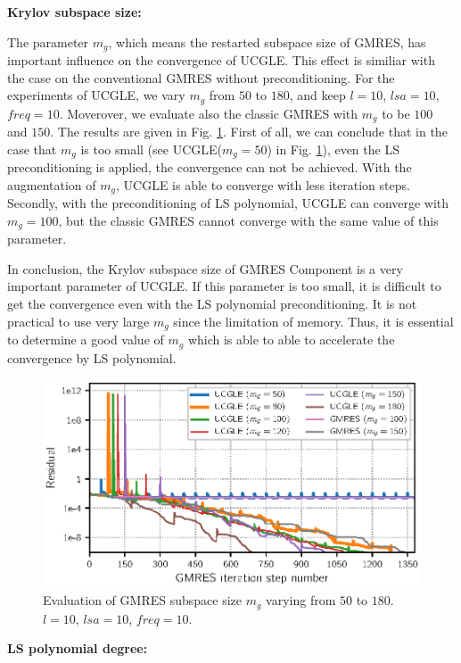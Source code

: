\textbf{Krylov subspace size: }

The parameter $m_g$, which means the restarted subspace size of GMRES, has important influence on the convergence of UCGLE.  This effect is similiar with the case on the conventional GMRES without preconditioning. For the experiments of UCGLE, we vary $m_g$ from $50$ to $180$, and keep $l=10$, $lsa=10$, $freq=10$. Moverover, we evaluate also the classic GMRES with $m_g$ to be $100$ and $150$. The results are given in Fig. \ref{fig:krylovsubspace}. First of all, we can conclude that in the case that $m_g$ is too small (see UCGLE($m_g=50$) in  Fig. \ref{fig:krylovsubspace}), even the LS preconditioning is applied, the convergence can not be achieved. With the augmentation of $m_g$, UCGLE is able to converge with less iteration steps. Secondly, with the preconditioning of LS polynomial, UCGLE can converge with $m_g=100$, but the classic GMRES cannot converge with the same value of this parameter.

In conclusion, the Krylov subspace size of GMRES Component is a very important parameter of UCGLE. If this parameter is too small, it is difficult to get the convergence even with the LS polynomial preconditioning. It is not practical to use very large $m_g$ since the limitation of memory. Thus, it is essential to determine a good value of $m_g$ which is able to able to accelerate the convergence by LS polynomial.

\begin{figure}[htbp]
	\centering
	\includegraphics[width=6.2in]{fig/conv_ksp_gmres.eps}
	\caption{Evaluation of GMRES subspace size $m_g$ varying from $50$ to $180$. $l=10$, $lsa=10$, $freq=10$.}
	\label{fig:krylovsubspace}
\end{figure}


\textbf{LS polynomial degree: }

